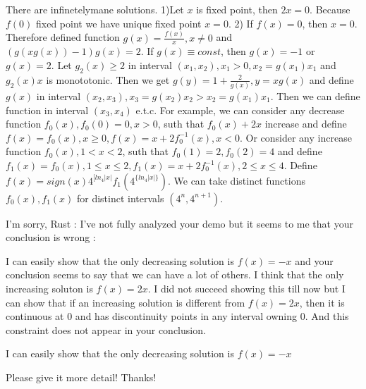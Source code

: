 \begin{solution}
	\begin{tcolorbox}There are infinetelymane solutions.
1)Let $ x$ is fixed point, then $ 2x = 0$. Because $ f(0)$ fixed point we have unique fixed point $ x = 0$.
2) If $ f(x) = 0$, then $ x = 0$. Therefore defined function $ g(x) = \frac {f(x)}{x}, x\not = 0$ and $ (g(xg(x)) - 1)g(x) = 2$.
If $ g(x)\equiv const$, then $ g(x) = - 1$ or $ g(x) = 2$.
Let $ g_2(x)\ge 2$ in interval $ (x_1,x_2), x_1 > 0, x_2 = g(x_1)x_1$ and $ g_2(x)x$ is monototonic. Then we get
$ g(y) = 1 + \frac {2}{g(x)},y = xg(x)$ and define $ g(x)$ in interval $ (x_2,x_3),x_3 = g(x_2)x_2 > x_2 = g(x_1)x_1$.
Then we can define function in interval $ (x_3,x_4)$ e.t.c.
For example, we can consider any decrease function $ f_0(x),f_0(0) = 0,x > 0$, suth that $ f_0(x) + 2x$ increase
and define $ f(x) = f_0(x),x\ge 0, f(x) = x + 2f_0^{ - 1}(x),x < 0$.
Or consider any increase function $ f_0(x), 1 < x < 2$, suth that $ f_0(1) = 2, f_0(2) = 4$ and define
$ f_1(x) = f_0(x), 1\le x\le 2, f_1(x) = x + 2f_0^{ - 1}(x), 2\le x\le 4$.
Define $ f(x) = sign(x) 4^{[ln_4|x|}f_1(4^{\{ln_4|x|\}})$. We can take distinct functions $ f_0(x),f_1(x)$ for distinct intervals $ (4^n,4^{n + 1})$.\end{tcolorbox}


I'm sorry, Rust : I've not fully analyzed your demo but it seems to me that your conclusion is wrong :

I can easily show that the only decreasing solution is $ f(x)=-x$ and your conclusion seems to say that we can have a lot of others.
I think that the only increasing soluton is $ f(x)=2x$. I did not succeed showing this till now but I can show that if an increasing solution is different from $ f(x)=2x$, then it is continuous at $ 0$ and has discontinuity points in any interval owning $ 0$. And this constraint does not appear in your conclusion.
\end{solution}



\begin{solution}
	\begin{tcolorbox}I can easily show that the only decreasing solution is $ f(x) = - x$\end{tcolorbox}
Please give it more detail! Thanks!
\end{solution}



